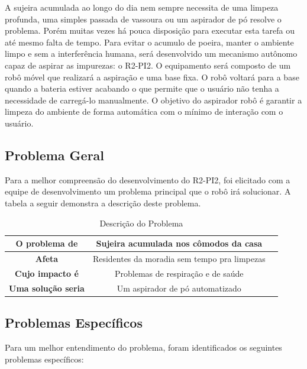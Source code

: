 A sujeira acumulada ao longo do dia nem sempre necessita de uma limpeza profunda, uma simples
passada de vassoura ou um aspirador de pó resolve o problema. Porém muitas vezes há pouca
disposição para executar esta tarefa ou até mesmo falta de tempo. Para evitar o acumulo de
poeira, manter o ambiente limpo e sem a interferência humana, será desenvolvido um mecanismo 
autônomo capaz de aspirar as impurezas: o R2-PI2. O equipamento será composto de um robô móvel que realizará a aspiração e uma base fixa. O robô voltará para a base quando a bateria estiver acabando o que permite que o usuário não tenha a necessidade de carregá-lo manualmente. O objetivo do aspirador robô é garantir a limpeza do ambiente de forma automática com o mínimo de interação com o usuário.

\subsection{Problema Geral} %
\label{sub:problemaGeral}

Para a melhor compreensão do desenvolvimento do R2-PI2, foi elicitado com a equipe de desenvolvimento um problema principal que o robô irá solucionar. A tabela a seguir demonstra a descrição deste problema.

\begin{table}[H]
	\centering
	\caption{Descrição do Problema}
	\label{tab:equipe}
	\begin{tabular}{|c|c|c|}
	\hline
	\textbf{O problema de}      &  Sujeira acumulada nos cômodos da casa \\ \hline
	\textbf{Afeta}              &  Residentes da moradia sem tempo pra limpezas\\ \hline
	\textbf{Cujo impacto é}     &  Problemas de respiração e de saúde \\ \hline
	\textbf{Uma solução seria} 	&  Um aspirador de pó automatizado \\ \hline
	\end{tabular}
	\end{table}


\subsection{Problemas Específicos} %
\label{sub:problemas_específicos}

Para um melhor entendimento do problema, foram identificados os seguintes problemas específicos:


